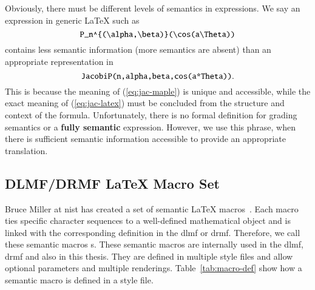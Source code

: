 Obviously, there must be different levels of semantics in expressions. We say an expression in generic \LaTeX{} such as 
\begin{equation}\label{eq:jac-latex}
\verb|P_n^{(\alpha,\beta)}(\cos(a\Theta))|
\end{equation}
contains less semantic information (more semantics are absent) than an appropriate representation in \Maple{}
\begin{equation}\label{eq:jac-maple}
\verb|JacobiP(n,alpha,beta,cos(a*Theta))|.
\end{equation}
This is because the meaning of (\ref{eq:jac-maple}) is unique and accessible, while the exact meaning of (\ref{eq:jac-latex}) must be concluded from the structure and context of the formula. Unfortunately, there is no formal definition for grading semantics or a \textbf{fully semantic} expression. However, we use this phrase, when there is sufficient semantic information accessible to provide an appropriate translation.

\subsection{DLMF/DRMF \LaTeX{} Macro Set}\label{subsec:macros}
Bruce Miller at \gls{nist} has created a set of semantic \LaTeX{} macros~\cite{DLMF:Macros}. Each macro ties specific character sequences to a well-defined mathematical object and is linked with the corresponding definition in the \gls{dlmf} or \gls{drmf}. Therefore, we call these semantic macros \Macro s. These semantic macros are internally used in the \gls{dlmf}, \gls{drmf} and also in this thesis. They are defined in multiple style files and allow optional parameters and multiple renderings. Table~\ref{tab:macro-def} show how a semantic macro is defined in a style file.

